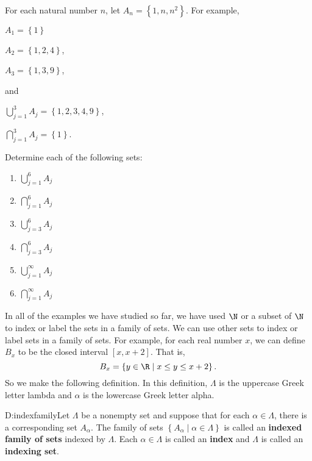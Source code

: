 \begin{prog} \label{prog:infinitefamily} \hfill \\
For each natural number $n$, let $A_n = \left\{ 1, n, n^2 \right\}$.  For example,
\begin{multicols}{3}
$A_1 = \left\{ 1 \right\}$

$A_2 = \left\{ 1, 2, 4 \right\}$,

$A_3 = \left\{ 1, 3, 9 \right\}$,
\end{multicols}
\noindent
and
\begin{multicols}{2}
$\bigcup\limits_{j=1}^{3}A_j = \left\{1, 2, 3, 4, 9 \right\}$,

$\bigcap\limits_{j=1}^{3}A_j = \left\{1 \right\}$.
\end{multicols}

\noindent
Determine each of the following sets:
\begin{multicols}{3}
\begin{enumerate}
\item $\bigcup\limits_{j=1}^{6}A_j$
\item $\bigcap\limits_{j=1}^{6}A_j$
\item $\bigcup\limits_{j=3}^{6}A_j$
\item $\bigcap\limits_{j=3}^{6}A_j$
\item $\bigcup\limits_{j=1}^{\infty}A_j$
\item $\bigcap\limits_{j=1}^{\infty}A_j$
\end{enumerate}
\end{multicols}
\end{prog}
\hbreak

In all of the examples we have studied so far, we have used $\N$ or a subset of $\N$ to index or label the sets in a family of sets.  We can use other sets to index or label sets in a family of sets.  For example, for each real number $x$, we can define $B_x$ to be the closed interval $\left[x, x + 2 \right]$.  That is,
\[
B_x = \left\{ y \in \R \mid x \leq y \leq x + 2 \right\}.
\]
So we make the following definition.  In this definition, $\Lambda$ is the uppercase Greek letter lambda and $\alpha$ is the lowercase Greek letter alpha.

\begin{defbox}{D:indexfamily}{Let $\Lambda$ be a nonempty set and suppose that for each 
$\alpha \in \Lambda$, there is a corresponding set $A_\alpha$.  The family of sets 
$\left\{ A_\alpha \mid \alpha \in \Lambda \right\}$ \label{sym:indexfamily} is called an 
\textbf{indexed family of sets}
%
%
%
 indexed by $\Lambda$.  Each $\alpha \in \Lambda$ is called an 
\textbf{index} and $\Lambda$ is called an \textbf{indexing set}.}
\end{defbox}

